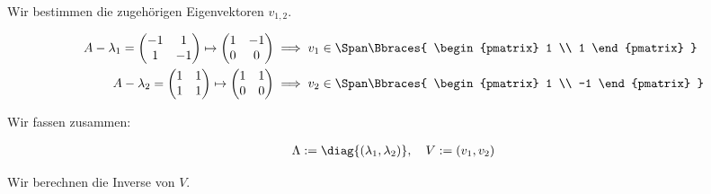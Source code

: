 \begin{solution}
Wir bestimmen die zugehörigen Eigenvektoren $v_{1, 2}$.

\begin{align*}
    A - \lambda_1
    =
    \begin{pmatrix}
        -1 &  1 \\
         1 & -1
    \end{pmatrix}
    \mapsto
    \begin{pmatrix}
        1 & -1 \\
        0 &  0
    \end{pmatrix}
    & \implies
    v_1 \in
    \Span \Bbraces
    {
        \begin{pmatrix}
            1 \\ 1
        \end{pmatrix}
    } \\
    A - \lambda_2
    =
    \begin{pmatrix}
        1 & 1 \\
        1 & 1
    \end{pmatrix}
    \mapsto
    \begin{pmatrix}
        1 & 1 \\
        0 & 0
    \end{pmatrix}
    & \implies
    v_2 \in
    \Span \Bbraces
    {
        \begin{pmatrix}
            1 \\ -1
        \end{pmatrix}
    }
\end{align*}

Wir fassen zusammen:

\begin{align*}
    \Lambda := \diag{(\lambda_1, \lambda_2)},
    \quad
    V := (v_1, v_2)
\end{align*}

Wir berechnen die Inverse von $V$.


\end{solution}

